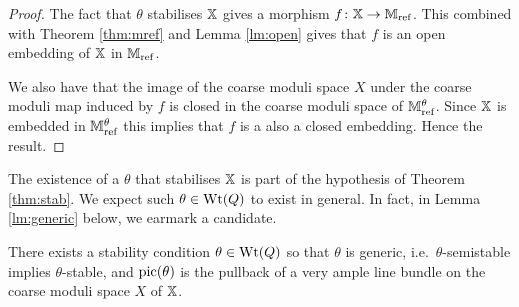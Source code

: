 \documentclass[12pt]{amsart}
\newcommand{\Wt}{\textup{Wt}}
\begin{document}
\begin{proof}
The fact that $\theta$ stabilises $\mathbb{X}$ gives a morphism $f \colon \mathbb{X} \rightarrow \mathbb{M}_{\text{ref}}$.
This combined with Theorem \ref{thm:mref} and Lemma \ref{lm:open} gives that $f$ is an open embedding of $\mathbb{X}$ in $\mathbb{M}_{\text{ref}}$.

We also have that the image of the coarse moduli space $X$ under the coarse moduli map induced by $f$ is closed in the coarse moduli space of $\mathbb{M}_\text{ref}^\theta$. Since $\mathbb{X}$ is embedded in $\mathbb{M}_\text{ref}^\theta$ this implies that $f$ is a also a closed embedding.
Hence the result.
\end{proof}

The existence of a $\theta$ that stabilises $\mathbb{X}$ is part of the hypothesis of Theorem \ref{thm:stab}.
We expect such $\theta \in \Wt(Q)$ to exist in general.
In fact, in Lemma \ref{lm:generic} below, we earmark a candidate.

\begin{lemma}\label{lm:generic}
There exists a stability condition $\theta \in \textup{Wt}(Q)$ so that $\theta$ is generic, i.e.\ $\theta$-semistable implies $\theta$-stable, and $\textup{pic}(\theta)$ is the pullback of a very ample line bundle on the coarse moduli space $X$ of $\mathbb{X}$.
\end{lemma}
\end{document}
